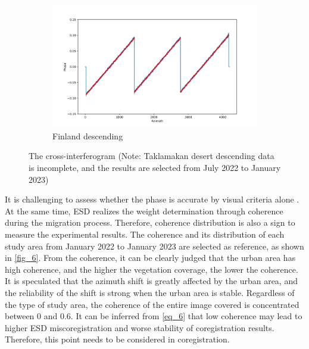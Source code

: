 \documentclass[preprint, authoryear]{elsarticle}
\begin{document}
\begin{figure}
\begin{subfigure}{0.5\textwidth}
\begin{minipage}{0.5\textwidth}
        \end{minipage}%
        \begin{minipage}{0.5\textwidth}
            \centering
            \includegraphics[width=\textwidth]{figure/The cross-interferogram/cross_interf_Finland_des_row&fitted_20230102.png}
        \end{minipage}
        \caption{Finland descending}
        \label{fig_5i}
    \end{subfigure}%
    \caption{The cross-interferogram (Note: Taklamakan desert descending data is incomplete, and the results are selected from July 2022 to January 2023)}
    \label{fig_5}
\end{figure}

It is challenging to assess whether the phase is accurate by visual criteria alone \cite{An_enhanced_spectral_diversity_coregistration_method_for_dual-polarimetric_Sentinel-1A/B_TOPS_data}. At the same time, ESD realizes the weight determination through coherence during the migration process. Therefore, coherence distribution is also a sign to measure the experimental results. The coherence and its distribution of each study area from January 2022 to January 2023 are selected as reference, as shown in \ref{fig_6}. From the coherence, it can be clearly judged that the urban area has high coherence, and the higher the vegetation coverage, the lower the coherence. It is speculated that the azimuth shift is greatly affected by the urban area, and the reliability of the shift is strong when the urban area is stable. Regardless of the type of study area, the coherence of the entire image covered is concentrated between 0 and 0.6. It can be inferred from \ref{eq_6} that low coherence may lead to higher ESD miscoregistration and worse stability of coregistration results. Therefore, this point needs to be considered in coregistration. \par
\end{document}
